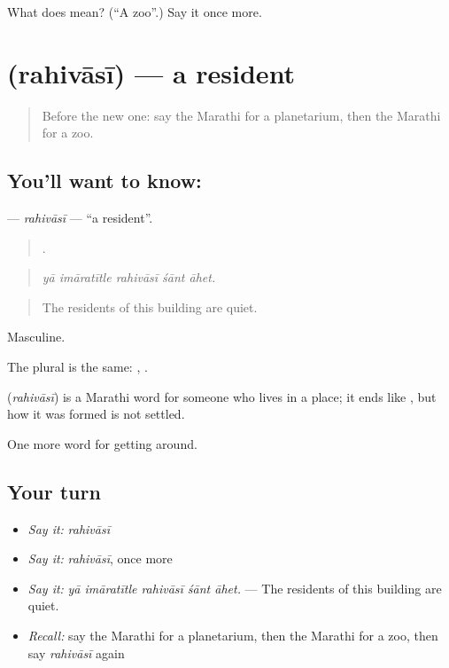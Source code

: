 \begin{tcolorbox}[breakable,colback=teal!4,colframe=teal!35!black,title={Before you move on}]
What does  mean? (\textquotedblleft{}A zoo\textquotedblright{}.) Say it once more.
\end{tcolorbox}
\section[\texorpdfstring{\mr{रहिवासी} (rahivāsī)}{रहिवासी (rahivāsī)}]{ (rahivāsī) — a resident}

\label{lesson:MR-C420-rahivasi}



\begin{quote}
Before the new one: say the Marathi for a planetarium, then the Marathi for a zoo.
\end{quote}

\subsection*{You'll want to know: }
\textbf{} — \emph{rahivāsī} — \textquotedblleft{}a resident\textquotedblright{}.

\begin{quote}
    .
\end{quote}

\begin{quote}
\emph{yā imāratītle rahivāsī śānt āhet.}
\end{quote}

\begin{quote}
The residents of this building are quiet.
\end{quote}

Masculine.

The plural is the same:  ,  .

\begin{cousinweb}
\textbf{} (\emph{rahivāsī}) is a Marathi word for someone who lives in a place; it ends like \textbf{}, but how it was formed is not settled.
\end{cousinweb}

\begin{grammarlens}[title={What you've built}]
One more word for getting around.
\end{grammarlens}

\subsection*{Your turn}
\begin{itemize}
\raggedright
  \item \emph{Say it:} \emph{rahivāsī}
  \item \emph{Say it:} \emph{rahivāsī}, once more
  \item \emph{Say it:} \emph{yā imāratītle rahivāsī śānt āhet.} — The residents of this building are quiet.
  \item \emph{Recall:} say the Marathi for a planetarium, then the Marathi for a zoo, then say \emph{rahivāsī} again
\end{itemize}

